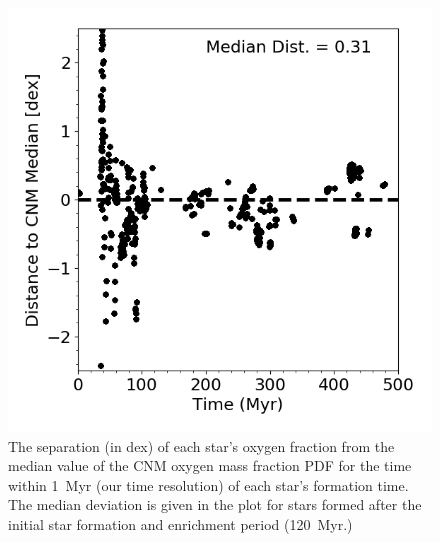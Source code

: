 \begin{figure}
\centering
\includegraphics[width=0.62\linewidth]{figures/ch3/stellar_CNM_distance}
\caption{The separation (in dex) of each star's oxygen fraction from the median value of the CNM oxygen mass fraction PDF for the time within 1~Myr (our time resolution) of each star's formation time. The median deviation is given in the plot for stars formed after the initial star formation and enrichment period (120~Myr.)}
\label{ch3:fig:stars}
\end{figure}


